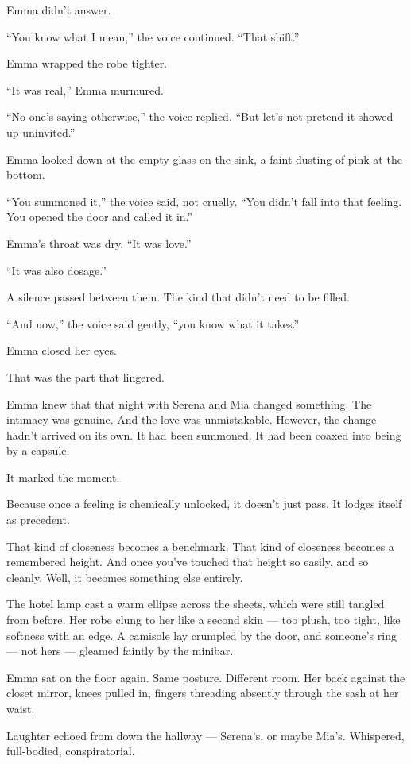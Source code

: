 Emma didn’t answer.

``You know what I mean,'' the voice continued. ``That shift.''

Emma wrapped the robe tighter.

``It was real,'' Emma murmured. 

``No one’s saying otherwise,'' the voice replied. ``But let’s not pretend it showed up uninvited.''

Emma looked down at the empty glass on the sink, a faint dusting of pink at the bottom.

``You summoned it,'' the voice said, not cruelly. ``You didn’t fall into that feeling. You opened 
the door and called it in.''

Emma’s throat was dry. ``It was love.''

``It was also dosage.''

A silence passed between them. The kind that didn’t need to be filled.

``And now,'' the voice said gently, ``you know what it takes.''

Emma closed her eyes.

That was the part that lingered.

Emma knew that that night with Serena and Mia changed something.
The intimacy was genuine. 
And the love was unmistakable. 
However, the change hadn’t arrived on its own. 
It had been summoned. 
It had been coaxed into being by a capsule.

It marked the moment.

Because once a feeling is chemically unlocked, it doesn’t just pass.
It lodges itself as precedent.

That kind of closeness becomes a benchmark. 
That kind of closeness becomes a remembered height.
And once you've touched that height so easily, and so cleanly. 
Well, it becomes something else entirely.

The hotel lamp cast a warm ellipse across the sheets, which were still tangled from before. Her 
robe clung to her like a second skin — too plush, too tight, like softness with an edge. A camisole 
lay crumpled by the door, and someone’s ring — not hers — gleamed faintly by the minibar.

Emma sat on the floor again. Same posture. Different room. Her back against the closet mirror, 
knees pulled in, fingers threading absently through the sash at her waist.

Laughter echoed from down the hallway — Serena’s, or maybe Mia’s. Whispered, full-bodied, 
conspiratorial.

